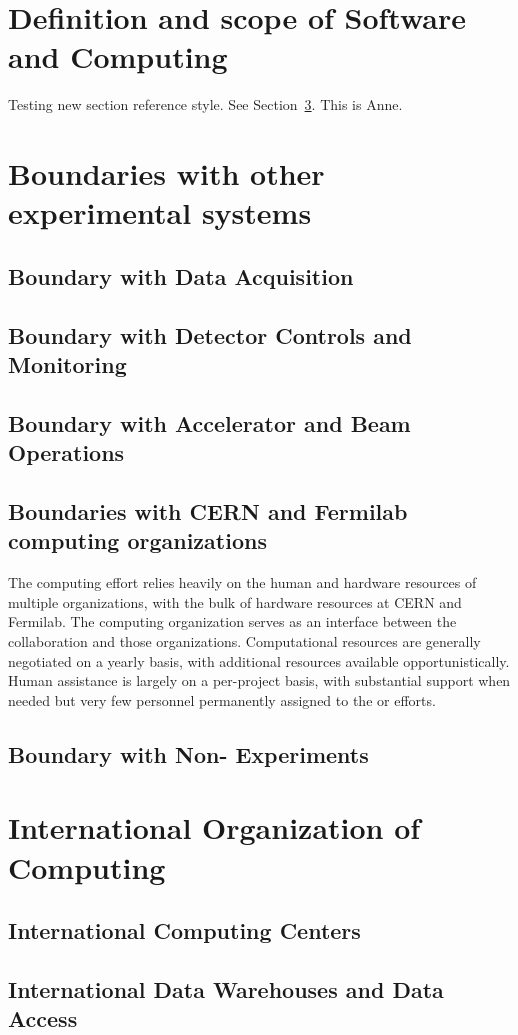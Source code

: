 \section{Definition and scope of Software and Computing}

Testing new section reference style. See Section~\ref{sw:ov-intl-org}. This is Anne.
\section{Boundaries with other experimental systems}
\subsection{Boundary with Data Acquisition}
\subsection{Boundary with Detector Controls and Monitoring}
\subsection{Boundary with Accelerator and Beam Operations}
\subsection{Boundaries with CERN and Fermilab computing organizations}
The   computing effort  relies heavily on the human and hardware resources of  multiple organizations,  with the bulk of hardware resources at CERN and Fermilab.  The    computing organization serves as an interface between the collaboration and those organizations.  Computational resources are generally negotiated on a yearly basis, with additional resources available opportunistically. Human assistance is largely on a per-project  basis, with substantial support when needed but very few personnel permanently assigned to the   or  efforts. 
\subsection{Boundary with Non-  Experiments}

\section{International Organization of Computing}
\label{sw:ov-intl-org}

\subsection{International Computing Centers}
\subsection{International Data Warehouses and Data Access}
